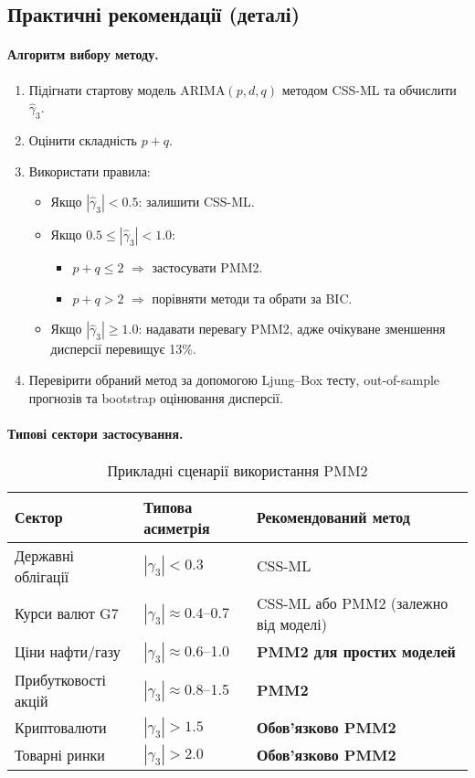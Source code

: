 \documentclass[12pt,a4paper]{article}
\begin{document}
\subsection{Практичні рекомендації (деталі)}
\label{app:wti_guidelines}

\paragraph{Алгоритм вибору методу.}
\begin{enumerate}
    \item Підігнати стартову модель ARIMA$(p,d,q)$ методом CSS-ML та обчислити $\hat{\gamma}_3$.
    \item Оцінити складність $p+q$.
    \item Використати правила:
    \begin{itemize}
        \item Якщо $|\hat{\gamma}_3| < 0.5$: залишити CSS-ML.
        \item Якщо $0.5 \leq |\hat{\gamma}_3| < 1.0$:
        \begin{itemize}
            \item $p+q \leq 2$ $\Rightarrow$ застосувати PMM2.
            \item $p+q > 2$ $\Rightarrow$ порівняти методи та обрати за BIC.
        \end{itemize}
        \item Якщо $|\hat{\gamma}_3| \geq 1.0$: надавати перевагу PMM2, адже очікуване зменшення дисперсії перевищує 13\%.
    \end{itemize}
    \item Перевірити обраний метод за допомогою Ljung--Box тесту, out-of-sample прогнозів та bootstrap оцінювання дисперсії.
\end{enumerate}

\paragraph{Типові сектори застосування.}
\begin{table}[htbp]
\centering
\caption{Прикладні сценарії використання PMM2}
\label{tab:wti_sector_recommendations}
\begin{tabular}{@{}lll@{}}
\toprule
\textbf{Сектор} & \textbf{Типова асиметрія} & \textbf{Рекомендований метод} \\
\midrule
Державні облігації & $|\gamma_3| < 0.3$ & CSS-ML \\
Курси валют G7 & $|\gamma_3| \approx 0.4$--0.7 & CSS-ML або PMM2 (залежно від моделі) \\
Ціни нафти/газу & $|\gamma_3| \approx 0.6$--1.0 & \textbf{PMM2 для простих моделей} \\
Прибутковості акцій & $|\gamma_3| \approx 0.8$--1.5 & \textbf{PMM2} \\
Криптовалюти & $|\gamma_3| > 1.5$ & \textbf{Обов'язково PMM2} \\
Товарні ринки & $|\gamma_3| > 2.0$ & \textbf{Обов'язково PMM2} \\
\bottomrule
\end{tabular}
\end{table}
\end{document}
